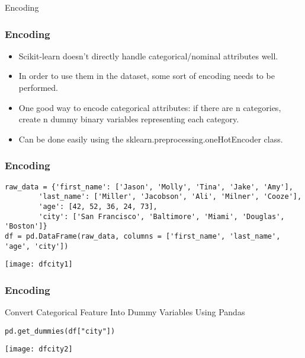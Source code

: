 \begin{frame}
  \begin{center}
    {\Large Encoding}
  \end{center}
\end{frame}

\begin{frame}[fragile]\frametitle{Encoding}
	\begin{itemize}
	\item Scikit-learn doesn't directly handle categorical/nominal attributes well.
	\item In order to use them in the dataset, some sort of encoding needs to be performed.
	\item One good way to encode categorical attributes: if there are n categories, create n dummy binary variables representing each category.
	\item Can be done easily using the sklearn.preprocessing.oneHotEncoder class.
	\end{itemize}
\end{frame}

\begin{frame}[fragile]\frametitle{Encoding}
\begin{lstlisting}
raw_data = {'first_name': ['Jason', 'Molly', 'Tina', 'Jake', 'Amy'], 
        'last_name': ['Miller', 'Jacobson', 'Ali', 'Milner', 'Cooze'], 
        'age': [42, 52, 36, 24, 73], 
        'city': ['San Francisco', 'Baltimore', 'Miami', 'Douglas', 'Boston']}
df = pd.DataFrame(raw_data, columns = ['first_name', 'last_name', 'age', 'city'])
\end{lstlisting}
\begin{center}
\texttt{[image: dfcity1]}
\end{center}
\end{frame}

\begin{frame}[fragile]\frametitle{Encoding}
Convert Categorical Feature Into Dummy Variables Using Pandas
\begin{lstlisting}
pd.get_dummies(df["city"])
\end{lstlisting}
\begin{center}
\texttt{[image: dfcity2]}
\end{center}
\end{frame}

